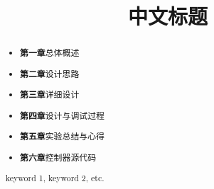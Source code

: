 \documentclass{mcmthesis}
\title{\LARGE\textbf{中文标题}} %
\begin{document}
\begin{abstract}
  \par
  \begin{itemize}
    \item \textbf{第一章}总体概述
    \item \textbf{第二章}设计思路
    \item \textbf{第三章}详细设计
    \item \textbf{第四章}设计与调试过程
    \item \textbf{第五章}实验总结与心得
    \item \textbf{第六章}控制器源代码
  \end{itemize}
  \begin{keywords}
    keyword 1, keyword 2, etc.
  \end{keywords}
\end{abstract}
\maketitle
\tableofcontents
\pagebreak






% 
\end{document}
